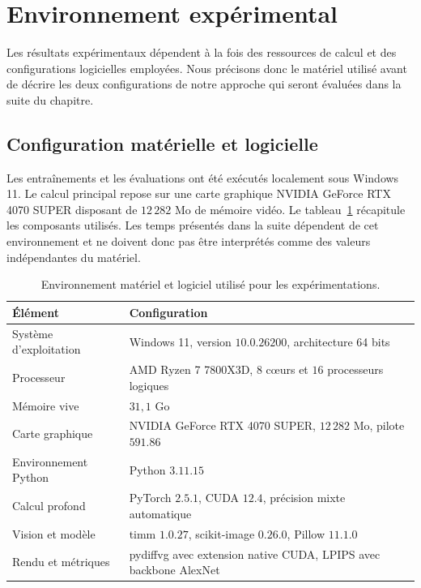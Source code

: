 \documentclass[12pt, a4paper, oneside]{report}
\begin{document}
\section{Environnement expérimental}
\label{sec:environnement_experimental}

Les résultats expérimentaux dépendent à la fois des ressources de calcul et des configurations logicielles employées. Nous précisons donc le matériel utilisé avant de décrire les deux configurations de notre approche qui seront évaluées dans la suite du chapitre.

\subsection{Configuration matérielle et logicielle}

Les entraînements et les évaluations ont été exécutés localement sous Windows 11. Le calcul principal repose sur une carte graphique NVIDIA GeForce RTX 4070 SUPER disposant de $12\,282$ Mo de mémoire vidéo. Le tableau~\ref{tab:environnement_experimental} récapitule les composants utilisés. Les temps présentés dans la suite dépendent de cet environnement et ne doivent donc pas être interprétés comme des valeurs indépendantes du matériel.

\begin{table}[H]
    \centering
    \small
    \caption{Environnement matériel et logiciel utilisé pour les expérimentations.}
    \label{tab:environnement_experimental}
    \begin{tabular}{p{4.2cm}p{8.4cm}}
        \toprule
        \textbf{Élément} & \textbf{Configuration} \\
        \midrule
        Système d'exploitation & Windows 11, version $10.0.26200$, architecture 64 bits \\
        Processeur & AMD Ryzen 7 7800X3D, $8$ cœurs et $16$ processeurs logiques \\
        Mémoire vive & $31{,}1$ Go \\
        Carte graphique & NVIDIA GeForce RTX 4070 SUPER, $12\,282$ Mo, pilote $591.86$ \\
        Environnement Python & Python $3.11.15$ \\
        Calcul profond & PyTorch $2.5.1$, CUDA $12.4$, précision mixte automatique \\
        Vision et modèle & timm $1.0.27$, scikit-image $0.26.0$, Pillow $11.1.0$ \\
        Rendu et métriques & pydiffvg avec extension native CUDA, LPIPS avec backbone AlexNet \\
        \bottomrule
    \end{tabular}
\end{table}
\end{document}
